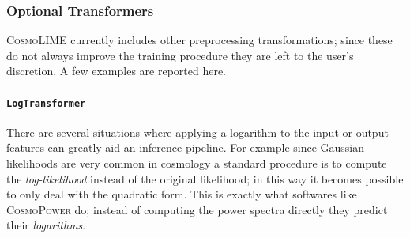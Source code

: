 \subsubsection{Optional Transformers}
\textsc{CosmoLIME} currently includes other preprocessing transformations; since these do not always improve the training procedure they are left to the user's discretion. 
A few examples are reported here.
\paragraph{\texttt{LogTransformer}}
There are several situations where applying a logarithm to the input or output features can greatly aid an inference pipeline. For example since Gaussian likelihoods are very common in cosmology a standard procedure is to compute the \emph{log-likelihood} instead of the original likelihood; in this way it becomes possible to only deal with the quadratic form. This is exactly what softwares like \textsc{CosmoPower} do; instead of computing the power spectra directly they predict their \emph{logarithms}.

